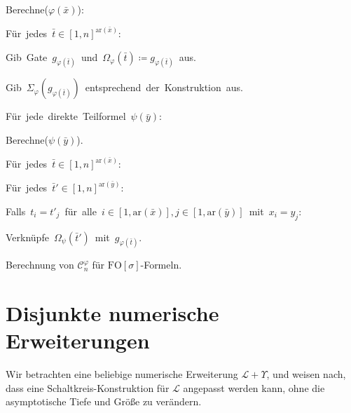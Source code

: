 \begin{algorithm}
\begin{lyxcode}
Berechne($\varphi\left(\bar{x}\right)$):~

\begin{lyxcode}
Für~jedes~$\bar{t}\in\left[1,n\right]^{\mathrm{ar}\left(\bar{x}\right)}$:~

\begin{lyxcode}
Gib~Gate~$g_{\varphi\left(\bar{t}\right)}$~und~$\Omega_{\varphi}\left(\bar{t}\right)\coloneqq g_{\varphi\left(\bar{t}\right)}$~aus.

Gib~$\Sigma_{\varphi}\left(g_{\varphi\left(\bar{t}\right)}\right)$~entsprechend~der~Konstruktion~aus.
\end{lyxcode}
Für~jede~direkte~Teilformel~$\psi\left(\bar{y}\right)$:~

\begin{lyxcode}
Berechne($\psi\left(\bar{y}\right)$).

Für~jedes~$\bar{t}\in\left[1,n\right]^{\mathrm{ar}\left(\bar{x}\right)}$:~

\begin{lyxcode}
Für~jedes~$\bar{t}'\in\left[1,n\right]^{\mathrm{ar}\left(\bar{y}\right)}$:~

\begin{lyxcode}
Falls~$t_{i}=t'_{j}$~für~alle~$i\in\left[1,\mathrm{ar}\left(\bar{x}\right)\right],j\in\left[1,\mathrm{ar}\left(\bar{y}\right)\right]$~mit~$x_{i}=y_{j}$:~

\begin{lyxcode}
Verknüpfe~$\Omega_{\psi}\left(\bar{t}'\right)$~mit~$g_{\varphi\left(\bar{t}\right)}$.
\end{lyxcode}
\end{lyxcode}
\end{lyxcode}
\end{lyxcode}
\end{lyxcode}
\end{lyxcode}
\caption{\label{alg:fo-circ}Berechnung von $\mathcal{C}_{n}^{\varphi}$ für
$\mathrm{FO}\left[\sigma\right]$-Formeln.}
\end{algorithm}


\section{Disjunkte numerische Erweiterungen}

Wir betrachten eine beliebige numerische Erweiterung $\mathcal{L}+\Upsilon$,
und weisen nach, dass eine Schaltkreis-Konstruktion für $\mathcal{L}$
angepasst werden kann, ohne die asymptotische Tiefe und Größe zu verändern.

